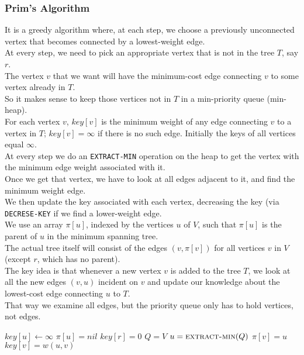 \documentclass[12pt]{article}
\theoremstyle{plain}
\theoremstyle{definition}
\newcommand{\lecture}[1]{\marginpar{{\footnotesize $\leftarrow$ \underline{#1}}}}
\begin{document}
\subsubsection{Prim's Algorithm}
\lecture{2016/11/08}
It is a greedy algorithm where, at each step, we choose a previously unconnected vertex that becomes connected by a lowest-weight edge. \\

At every step, we need to pick an appropriate vertex that is not in the tree $T$, say $r$. \\
The vertex $v$ that we want will have the minimum-cost edge connecting $v$ to some vertex already in $T$. \\
So it makes sense to keep those vertices not in $T$ in a min-priority queue (min-heap). \\

For each vertex $v$, $key[v]$ is the minimum weight of any edge connecting $v$ to a vertex in $T$;
$key[v] = \infty$ if there is no such edge.
Initially the keys of all vertices equal $\infty$. \\

At every step we do an \texttt{EXTRACT-MIN} operation on the heap to get the vertex with the minimum edge weight associated with it. \\
Once we get that vertex, we have to look at all edges adjacent to it, and find the minimum weight edge. \\
We then update the key associated with each vertex, decreasing the key (via \texttt{DECRESE-KEY} if we find a lower-weight edge. \\

We use an array $\pi[u]$, indexed by the vertices $u$ of $V$, such that $\pi[u]$ is the parent of $u$ in the minimum spanning tree. \\
The actual tree itself will consist of the edges $(v, \pi[v])$ for all vertices $v$ in $V$ (except $r$, which has no parent). \\

The key idea is that whenever a new vertex $v$ is added to the tree $T$, we look at all the new edges $(v, u)$ incident on $v$ and update our knowledge about the lowest-cost edge connecting $u$ to $T$. \\
That way we examine all edges, but the priority queue only has to hold vertices, not edges.

\begin{algorithmic}
    \State {}
    \State $key[u] \gets \infty$
    \State {}
    \State $\pi[u] = nil$
  \EndFor
  \State $key[r] = 0$
  \State {}
  \State $Q = V$
    \State $u = \Call{extract-min}{Q}$
        \State $\pi[v] = u$
        \State $key[v] = w(u, v)$
      \EndIf
    \EndFor
  \EndWhile
\EndFunction
\end{algorithmic}
\end{document}
